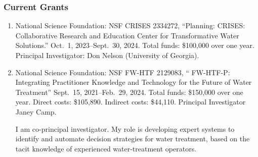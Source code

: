 %
%
\subsubsection{Current Grants}
\begin{enumerate}
%
\item National Science Foundation: NSF CRISES 2334272,
``Planning: CRISES: Collaborative Research and Education Center for Transformative 
Water Solutions.'' 
Oct.~1, 2023--Sept.~30, 2024.
Total funds: \$100,000 over one year.
Principal Investigator: Don Nelson (University of Georgia).
%
\item National Science Foundation: NSF FW-HTF 2129083,
`` FW-HTF-P: Integrating Practitioner Knowledge and Technology for the Future of Water Treatment''
Sept.~15, 2021--Feb.~29, 2024.
Total funds: \$150,000 over one year. Direct costs: \$105,890. Indirect costs: \$44,110.
Principal Investigator Janey Camp.
\begin{credit}
I am co-principal investigator. My role is developing expert systems to
identify and automate decision strategies for water treatment, based on the
tacit knowledge of experienced water-treatment operators.
\end{credit}
%
\end{enumerate}
%
\iffalse
\subsubsection{Pending Grant Proposals}
\fi
%
